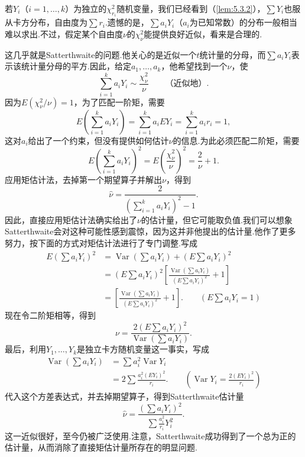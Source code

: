 \begin{example}[Satterthwaite近似]\label{ex:7.2.3}
若$Y_i$（$i=1,\ldots,k$）为独立的$\chi_{r_i}^2$随机变量，我们已经看到（\autoref{lem:5.3.2}），$\sum Y_i$也服从卡方分布，自由度为$\sum r_i$.遗憾的是，$\sum a_iY_i$（$a_i$为已知常数）的分布一般相当难以求出.不过，假定某个自由度$\nu$的$\chi_\nu^2$能提供良好近似，看来是合理的.

这几乎就是Satterthwaite的问题.他关心的是近似一个$t$统计量的分母，而$\sum a_iY_i$表示该统计量分母的平方.因此，给定$a_1,\ldots,a_k$，他希望找到一个$\nu$，使
$$\sum_{i=1}^ka_iY_i\sim\frac{\chi_\nu^2}\nu\qquad\text{（近似地）}.$$
因为$E(\chi_\nu^2/\nu)=1$，为了匹配一阶矩，需要
$$E\left(\sum_{i=1}^ka_iY_i\right)=\sum_{i=1}^ka_iEY_i=\sum_{i=1}^ka_ir_i=1,$$
这对$a_i$给出了一个约束，但没有提供如何估计$\nu$的信息.为此必须匹配二阶矩，需要
$$E\left(\sum_{i=1}^ka_iY_i\right)^2=E\left(\frac{\chi_\nu^2}\nu\right)^2=\frac2\nu+1.$$
应用矩估计法，去掉第一个期望算子并解出$\nu$，得到
$$\widehat\nu=\frac2{(\sum_{i=1}^ka_iY_i)^2-1}.$$
因此，直接应用矩估计法确实给出了$\nu$的估计量，但它可能取负值.我们可以想象Satterthwaite会对这种可能性感到震惊，因为这并非他提出的估计量.他作了更多努力，按下面的方式对矩估计法进行了专门调整.写成
\begin{align*}
E\left(\sum a_iY_i\right)^2
&=\operatorname{Var}\left(\sum a_iY_i\right)+\left(E\sum a_iY_i\right)^2\\
&=\left(E\sum a_iY_i\right)^2\left[\frac{\operatorname{Var}(\sum a_iY_i)}{(E\sum a_iY_i)^2}+1\right]\\
&=\left[\frac{\operatorname{Var}(\sum a_iY_i)}{(E\sum a_iY_i)^2}+1\right].\qquad\left(E\sum a_iY_i=1\right)
\end{align*}
现在令二阶矩相等，得到
$$\nu=\frac{2(E\sum a_iY_i)^2}{\operatorname{Var}(\sum a_iY_i)}.$$
最后，利用$Y_1,\ldots,Y_k$是独立卡方随机变量这一事实，写成
\begin{align*}
\operatorname{Var}\left(\sum a_iY_i\right)&=\sum a_i^2\operatorname{Var}Y_i\\
&=2\sum\frac{a_i^2(EY_i)^2}{r_i}.\qquad\left(\operatorname{Var}Y_i=\frac{2(EY_i)^2}{r_i}\right)
\end{align*}
代入这个方差表达式，并去掉期望算子，得到Satterthwaite估计量
$$\widehat\nu=\frac{(\sum a_iY_i)^2}{\sum\frac{a_i^2}{r_i}Y_i^2}.$$
这一近似很好，至今仍被广泛使用.注意，Satterthwaite成功得到了一个总为正的估计量，从而消除了直接矩估计量所存在的明显问题.
\end{example}
